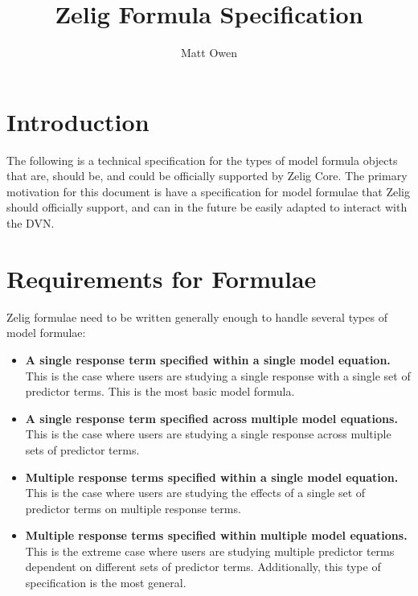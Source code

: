 \documentclass{article}
\title{Zelig Formula Specification}
\author{Matt Owen}
\begin{document}
\maketitle

\section{Introduction}

The following is a technical specification for the types of model formula
objects that are, should be, and could be officially supported by Zelig Core.
The primary motivation for this document is have a specification for model
formulae that Zelig should officially support, and can in the future be easily
adapted to interact with the DVN.


%
%
%
\section{Requirements for Formulae}
\label{sec:req}

Zelig formulae need to be written generally enough to handle several types of
model formulae:

\begin{itemize}

  \item {\bf A single response term specified within a single model equation.}
    This is the case where users are studying a single response with a single
    set of predictor terms. This is the most basic model formula.

  \item {\bf A single response term specified across multiple model equations.}
    This is the case where users are studying a single response across multiple
    sets of predictor terms.

  \item {\bf Multiple response terms specified within a single model equation.}
    This is the case where users are studying the effects of a single set of
    predictor terms on multiple response terms.

  \item {\bf Multiple response terms specified within multiple model equations.}
    This is the extreme case where users are studying multiple predictor terms
    dependent on different sets of predictor terms. Additionally, this type of
    specification is the most general.

\end{itemize}
\end{document}
